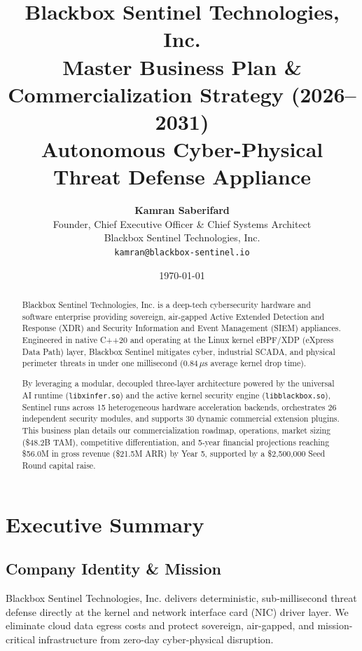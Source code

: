 \documentclass[11pt,a4paper]{article}
\title{\LARGE \textbf{Blackbox Sentinel Technologies, Inc.}\\
\Large Master Business Plan \& Commercialization Strategy (2026--2031)\\
\large Autonomous Cyber-Physical Threat Defense Appliance}
\author{
    \textbf{Kamran Saberifard}\\
    Founder, Chief Executive Officer \& Chief Systems Architect\\
    Blackbox Sentinel Technologies, Inc.\\
    \texttt{kamran@blackbox-sentinel.io}
}
\date{\today}
\begin{document}
\maketitle

\begin{abstract}
Blackbox Sentinel Technologies, Inc. is a deep-tech cybersecurity hardware and software enterprise providing sovereign, air-gapped Active Extended Detection and Response (XDR) and Security Information and Event Management (SIEM) appliances. Engineered in native C++20 and operating at the Linux kernel eBPF/XDP (eXpress Data Path) layer, Blackbox Sentinel mitigates cyber, industrial SCADA, and physical perimeter threats in under one millisecond ($0.84\,\mu\text{s}$ average kernel drop time). 

By leveraging a modular, decoupled three-layer architecture powered by the universal AI runtime (\texttt{libxinfer.so}) and the active kernel security engine (\texttt{libblackbox.so}), Sentinel runs across 15 heterogeneous hardware acceleration backends, orchestrates 26 independent security modules, and supports 30 dynamic commercial extension plugins. This business plan details our commercialization roadmap, operations, market sizing (\$48.2B TAM), competitive differentiation, and 5-year financial projections reaching \$56.0M in gross revenue (\$21.5M ARR) by Year 5, supported by a \$2,500,000 Seed Round capital raise.
\end{abstract}

\vspace{0.5cm}

\section{Executive Summary}

\subsection{Company Identity \& Mission}
Blackbox Sentinel Technologies, Inc. delivers deterministic, sub-millisecond threat defense directly at the kernel and network interface card (NIC) driver layer. We eliminate cloud data egress costs and protect sovereign, air-gapped, and mission-critical infrastructure from zero-day cyber-physical disruption.
\end{document}
